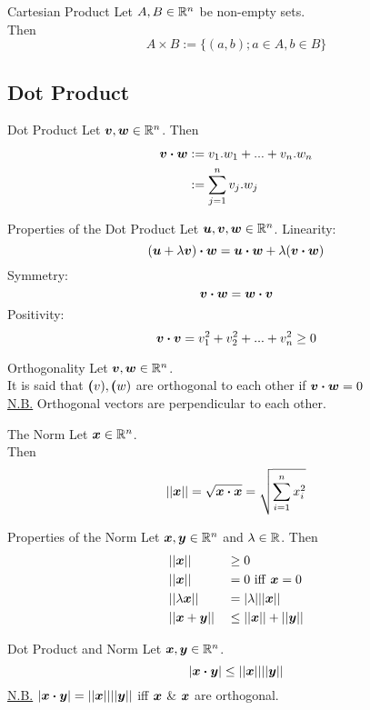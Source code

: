 \documentclass[11pt,a4paper]{article}
\begin{document}
\subtitle{Definition 2.03 - }{Cartesian Product}
Let $A, B \in \mathbb{R}^n$ be non-empty sets. \\
Then $$A \times B := \{(a,b); a \in A, b \in B\}$$

\subsection{Dot Product}
%
\subtitle{Definition 2.04 - }{Dot Product}
Let $\boldsymbol{v}, \boldsymbol{w} \in \mathbb{R}^n$. Then \begin{alignat*}{1}
\boldsymbol{v} \boldsymbol{\cdot} \boldsymbol{w} &:= v_1.w_1 + ... + v_n.w_n \\
&:= \sum_{j=1}^n v_j.w_j
\end{alignat*}

\subtitle{Theorem 2.05 - }{Properties of the Dot Product}
Let $\boldsymbol{u}, \boldsymbol{v}, \boldsymbol{w} \in \mathbb{R}^n$.
Linearity: $$(\boldsymbol{u} + \lambda\boldsymbol{v}) \boldsymbol{\cdot} \boldsymbol{w} = \boldsymbol{u} \boldsymbol{\cdot} \boldsymbol{w} + \lambda(\boldsymbol{v} \boldsymbol{\cdot} \boldsymbol{w})$$
Symmetry: $$\boldsymbol{v} \boldsymbol{\cdot} \boldsymbol{w} = \boldsymbol{w} \boldsymbol{\cdot} \boldsymbol{v}$$
Positivity: $$\boldsymbol{v} \boldsymbol{\cdot} \boldsymbol{v} = v_1^2 + v_2^2 + ... +v_n^2 \geq 0$$

\subtitle{Definition 2.06 - }{Orthogonality}
Let $\boldsymbol{v}, \boldsymbol{w} \in \mathbb{R}^n$. \\
It is said that $\boldsymbol{(}v), \boldsymbol{(}w)$ are orthogonal to each other if $\boldsymbol{v} \boldsymbol{\cdot} \boldsymbol{w} = 0$ \\
\underline{N.B.} Orthogonal vectors are perpendicular to each other. \\

\subtitle{Definition 2.07 - }{The Norm}
Let $\boldsymbol{x} \in \mathbb{R}^n$.\\
Then $$||\boldsymbol{x}|| = \sqrt{\boldsymbol{x} \boldsymbol{\cdot} \boldsymbol{x}} = \sqrt{\sum_{i=1}^n x_i^2}$$

\newpage
%
\subtitle{Theorem 2.08 - }{Properties of the Norm}
Let $\boldsymbol{x}, \boldsymbol{y} \in \mathbb{R}^n$ and $\lambda \in \mathbb{R}$. Then
\begin{alignat*}{2}
  &||\boldsymbol{x}|| &&\geq 0 \\
  &||\boldsymbol{x}|| &&= 0 \mathrm{\ iff\ } \boldsymbol{x} = 0 \\
  &||\lambda\boldsymbol{x}|| &&= |\lambda| ||\boldsymbol{x}|| \\
  &||\boldsymbol{x} + \boldsymbol{y}|| &&\leq ||\boldsymbol{x}|| + ||\boldsymbol{y}||
\end{alignat*}

\subtitle{Theorem 2.09 - }{Dot Product and Norm}
Let $\boldsymbol{x}, \boldsymbol{y} \in \mathbb{R}^n$.
$$|\boldsymbol{x} \boldsymbol{\cdot} \boldsymbol{y}| \leq ||\boldsymbol{x}|| ||\boldsymbol{y}||$$
\underline{N.B.} $|\boldsymbol{x} \boldsymbol{\cdot} \boldsymbol{y}| = ||\boldsymbol{x}|| ||\boldsymbol{y}||$ iff $\boldsymbol{x}$ \& $\boldsymbol{x}$ are orthogonal.\\
\end{document}
